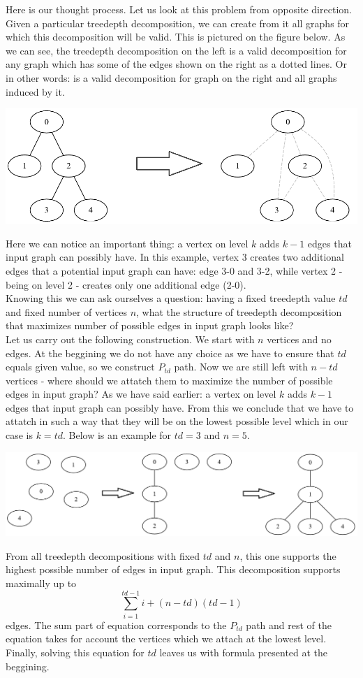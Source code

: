 Here is our thought process.
Let us look at this problem from opposite direction. Given a particular treedepth decomposition, we can create from it all graphs for which this decomposition will be valid. This is pictured on the figure below. As we can see, the treedepth decomposition on the left is a valid decomposition for any graph which has some of the edges shown on the right as a dotted lines. Or in other words: is a valid decomposition for graph on the right and all graphs induced by it.
\begin{center}
	\includegraphics[width=\textwidth]{transform.png}
\end{center}
Here we can notice an important thing: a vertex on level $k$ adds $k-1$ edges that input graph can possibly have. In this example, vertex 3 creates two additional edges that a potential input graph can have: edge 3-0 and 3-2, while vertex 2 - being on level 2 - creates only one additional edge (2-0).\\
Knowing this we can ask ourselves a question: having a fixed treedepth value $td$ and fixed number of vertices $n$, what the structure of treedepth decomposition that maximizes number of possible edges in input graph looks like?\\
Let us carry out the following construction. We start with $n$ vertices and no edges.
At the beggining we do not have any choice as we have to ensure that $td$ equals given value, so we construct $P_{td}$ path. Now we are still left with $n-td$ vertices - where should we attatch them to maximize the number of possible edges in input graph? As we have said earlier: a vertex on level $k$ adds $k-1$ edges that input graph can possibly have. From this we conclude that we have to attatch in such a way that they will be on the lowest possible level which in our case is $k=td$. Below is an example for $td=3$ and $n=5$.
\begin{center}
	\includegraphics[width=\textwidth]{construction.png}
\end{center}
From all treedepth decompositions with fixed $td$ and $n$, this one supports the highest possible number of edges in input graph. This decomposition supports maximally up to
$$\sum\limits_{i=1}^{td-1} i + (n-td)(td-1)$$edges. The sum part of equation corresponds to the $P_{td}$ path and rest of the equation takes for account the vertices which we attach at the lowest level.\\
Finally, solving this equation for $td$ leaves us with formula presented at the beggining.
